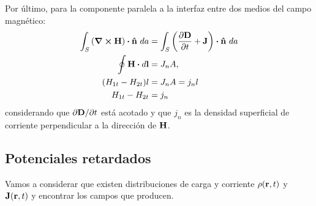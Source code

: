 Por último, para la componente paralela a la interfaz entre dos medios
del campo magnético:
\begin{align}
\int_S \qty(\curl{\vb{H}})\vdot \uv{n}\ da &= 
\int_S \qty(\pdv{\vb{D}}{t}+\vb{J})\vdot \uv{n}\ da\\
\oint \vb{H}\vdot d\vb{l} &= J_n A, \\
\qty(H_{1t}-H_{2t})l&=J_nA=j_{n}l\\
H_{1t}-H_{2t}&=j_{n}
\end{align}
considerando que $\partial \vb{D}/\partial t$ está acotado y que 
$j_n$ es la densidad superficial de corriente perpendicular 
a la dirección de $\vb{H}$.

\subsection{Potenciales retardados}
Vamos a considerar que existen distribuciones de carga y corriente 
$\rho(\vb{r},t)$ y $\vb{J}(\vb{r},t)$ y encontrar los campos que 
producen.

